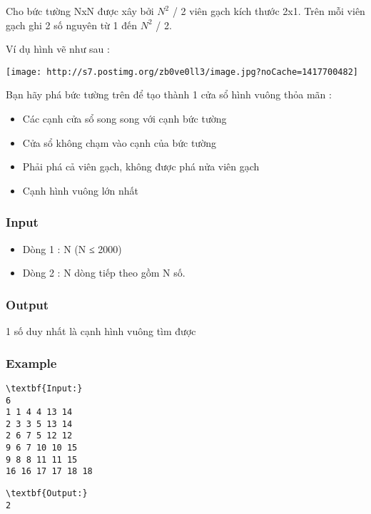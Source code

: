 

Cho bức tường NxN được xây bởi $N^{2}$ / 2 viên gạch kích thước 2x1. Trên mỗi viên gạch ghi 2 số nguyên từ 1 đến $N^{2}$ / 2.

Ví dụ hình vẽ như sau :


\texttt{[image: http://s7.postimg.org/zb0ve0ll3/image.jpg?noCache=1417700482]}

Bạn hãy phá bức tường trên để tạo thành 1 cửa sổ hình vuông thỏa mãn :
\begin{itemize}
	\item Các cạnh cửa sổ song song với cạnh bức tường
	\item Cửa sổ không chạm vào cạnh của bức tường
	\item Phải phá cả viên gạch, không được phá nửa viên gạch
	\item Cạnh hình vuông lớn nhất
\end{itemize}

\subsubsection{Input}
\begin{itemize}
	\item Dòng 1 : N (N ≤ 2000)
	\item Dòng 2 : N dòng tiếp theo gồm N số.
\end{itemize}

\subsubsection{Output}

1 số duy nhất là cạnh hình vuông tìm được

\subsubsection{Example}
\begin{verbatim}
\textbf{Input:}
6
1 1 4 4 13 14
2 3 3 5 13 14
2 6 7 5 12 12
9 6 7 10 10 15
9 8 8 11 11 15
16 16 17 17 18 18 \end{verbatim}
\begin{verbatim}
\textbf{Output:}
2\end{verbatim}
